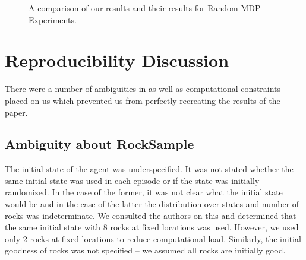 \documentclass[11pt,twocolumn]{article}
\begin{document}
\begin{figure}[h]
\centering
{}
\hspace{4mm}
\caption{A comparison of our results and their results for Random MDP Experiments.}
\end{figure}

\section{Reproducibility Discussion}
\label{sec: repDisc}

There were a number of ambiguities in \cite{jiang2015dependence} as well as computational constraints placed on us which prevented us from perfectly recreating the results of the paper. 

\subsection{Ambiguity about RockSample}
The initial state of the agent was underspecified. It was not stated whether the same initial state was used in each episode or if the state was initially randomized. In the case of the former, it was not clear what the initial state would be and in the case of the latter the distribution over states and number of rocks was indeterminate. We consulted the authors on this and determined that the same initial state with 8 rocks at fixed locations was used. However, we used only 2 rocks at fixed locations to reduce computational load. Similarly, the initial goodness of rocks was not specified -- we assumed all rocks are initially good.
\end{document}
